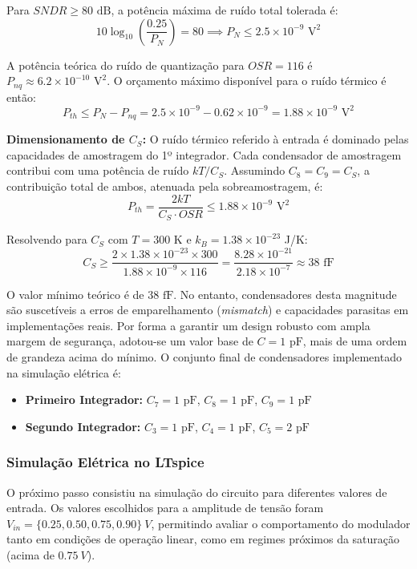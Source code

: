 Para $SNDR \ge 80\text{ dB}$, a potência máxima de ruído total tolerada é:
$$10 \log_{10}\!\left(\frac{0.25}{P_N}\right) = 80 \implies P_N \le 2.5 \times 10^{-9} \text{ V}^2$$

A potência teórica do ruído de quantização para $OSR = 116$ é $P_{nq} \approx 6.2 \times 10^{-10}
\text{ V}^2$. O orçamento máximo disponível para o ruído térmico é então:
$$P_{th} \le P_N - P_{nq} = 2.5 \times 10^{-9} - 0.62 \times 10^{-9} = 1.88 \times 10^{-9} \text{ V}^2$$

\textbf{Dimensionamento de $C_S$:}
O ruído térmico referido à entrada é dominado pelas capacidades de amostragem do 1º integrador.
Cada condensador de amostragem contribui com uma potência de ruído $kT/C_S$. Assumindo
$C_8 = C_9 = C_S$, a contribuição total de ambos, atenuada pela sobreamostragem, é:
$$P_{th} = \frac{2kT}{C_S \cdot OSR} \le 1.88 \times 10^{-9} \text{ V}^2$$

Resolvendo para $C_S$ com $T = 300\text{ K}$ e $k_B = 1.38 \times 10^{-23}$ J/K:
$$C_S \ge \frac{2 \times 1.38 \times 10^{-23} \times 300}{1.88 \times 10^{-9} \times 116} = \frac{8.28 \times 10^{-21}}{2.18 \times 10^{-7}} \approx 38 \text{ fF}$$

O valor mínimo teórico é de $38\text{ fF}$. No entanto, condensadores desta magnitude são
suscetíveis a erros de emparelhamento (\textit{mismatch}) e capacidades parasitas em
implementações reais. Por forma a garantir um design robusto com ampla margem de segurança,
adotou-se um valor base de $C = 1\text{ pF}$, mais de uma ordem de grandeza acima do mínimo.
O conjunto final de condensadores implementado na simulação elétrica é:

\begin{itemize}
    \item \textbf{Primeiro Integrador:} $C_7 = 1\text{ pF}$, $C_8 = 1\text{ pF}$, $C_9 = 1\text{ pF}$
    \item \textbf{Segundo Integrador:} $C_3 = 1\text{ pF}$, $C_4 = 1\text{ pF}$, $C_5 = 2\text{ pF}$
\end{itemize}

\vspace{0.5cm}
\subsubsection{Simulação Elétrica no LTspice}

O próximo passo consistiu na simulação do circuito para diferentes valores de entrada. 
Os valores escolhidos para a amplitude de tensão foram $V_{in} = \{0.25, 0.50, 0.75, 0.90\}~V$,
permitindo avaliar o comportamento do modulador tanto em condições de operação linear, 
como em regimes próximos da saturação (acima de $0.75~V$).

